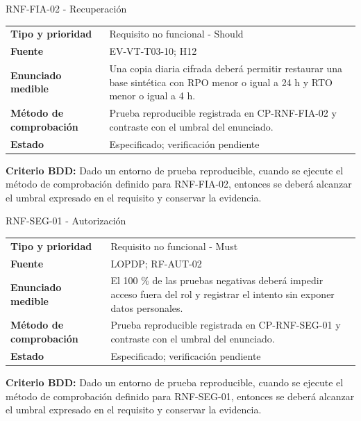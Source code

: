 \documentclass[11pt,a4paper]{article}
\begin{document}
\begin{reqbox}[colframe=Teal]{RNF-FIA-02 - Recuperación}
\begin{tabularx}{\textwidth}{>{\bfseries}p{3.2cm}Y}
Tipo y prioridad & Requisito no funcional - Should \\
Fuente & EV-VT-T03-10; H12 \\
Enunciado medible & Una copia diaria cifrada deberá permitir restaurar una base sintética con RPO menor o igual a 24 h y RTO menor o igual a 4 h. \\
Método de comprobación & Prueba reproducible registrada en CP-RNF-FIA-02 y contraste con el umbral del enunciado. \\
Estado & Especificado; verificación pendiente \\
\end{tabularx}
\textbf{Criterio BDD:} Dado un entorno de prueba reproducible, cuando se ejecute el método de comprobación definido para RNF-FIA-02, entonces se deberá alcanzar el umbral expresado en el requisito y conservar la evidencia.
\end{reqbox}


\begin{reqbox}[colframe=Teal]{RNF-SEG-01 - Autorización}
\begin{tabularx}{\textwidth}{>{\bfseries}p{3.2cm}Y}
Tipo y prioridad & Requisito no funcional - Must \\
Fuente & LOPDP; RF-AUT-02 \\
Enunciado medible & El 100 \% de las pruebas negativas deberá impedir acceso fuera del rol y registrar el intento sin exponer datos personales. \\
Método de comprobación & Prueba reproducible registrada en CP-RNF-SEG-01 y contraste con el umbral del enunciado. \\
Estado & Especificado; verificación pendiente \\
\end{tabularx}
\textbf{Criterio BDD:} Dado un entorno de prueba reproducible, cuando se ejecute el método de comprobación definido para RNF-SEG-01, entonces se deberá alcanzar el umbral expresado en el requisito y conservar la evidencia.
\end{reqbox}
\end{document}
